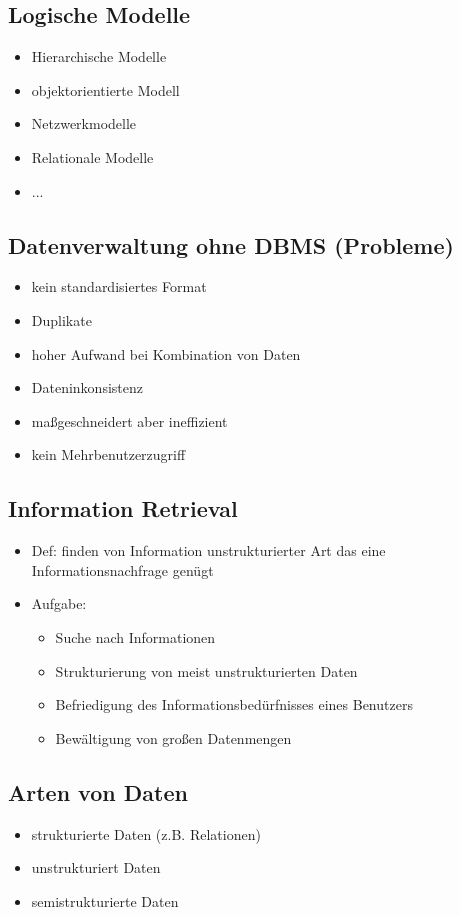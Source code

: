 \documentclass[a4paper]{article}
\begin{document}
\subsection{Logische Modelle}
\begin{itemize}
    \item Hierarchische Modelle
    \item objektorientierte Modell
    \item Netzwerkmodelle
    \item Relationale Modelle
    \item ...
\end{itemize}

\subsection{Datenverwaltung ohne DBMS (Probleme)}
\begin{itemize}
    \item kein standardisiertes Format
    \item Duplikate
    \item hoher Aufwand bei Kombination von Daten
    \item Dateninkonsistenz
    \item maßgeschneidert aber ineffizient
    \item kein Mehrbenutzerzugriff
\end{itemize}

\newpage

\subsection{Information Retrieval}
\begin{itemize}
    \item Def: finden von Information unstrukturierter Art das eine Informationsnachfrage genügt
    \item Aufgabe:
    \begin{itemize}
        \item Suche nach Informationen
        \item Strukturierung von meist unstrukturierten Daten
        \item Befriedigung des Informationsbedürfnisses eines Benutzers
        \item Bewältigung von großen Datenmengen
    \end{itemize}
\end{itemize}

\subsection{Arten von Daten}
\begin{itemize}
    \item strukturierte Daten (z.B. Relationen)
    \item unstrukturiert Daten 
    \item semistrukturierte Daten
\end{itemize}
\end{document}
